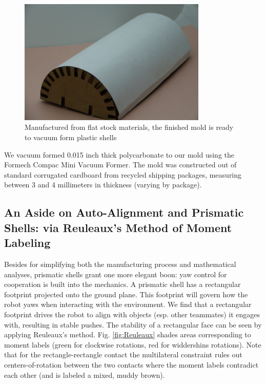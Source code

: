 \documentclass[letterpaper]{report}
\begin{document}
\begin{figure}
\centering
\includegraphics[width=0.8\textwidth]{FinishedMold.jpg}
\caption{\label{fig:Finished Mold}Manufactured from flat stock materials, the finished mold is ready to vacuum form plastic shells}
\end{figure}

We vacuum formed 0.015 inch thick polycarbonate to our mold using the Formech Compac Mini Vacuum Former.
The mold was constructed out of standard corrugated cardboard from recycled shipping packages, measuring between 3 and 4 millimeters in thickness (varying by package).

\subsection{An Aside on Auto-Alignment and Prismatic Shells: via Reuleaux's Method of Moment Labeling \label{sec:Reuleaux}}
Besides for simplifying both the manufacturing process and mathematical analyses, prismatic shells grant one more elegant boon: yaw control for cooperation is built into the mechanics.
A prismatic shell has a rectangular footprint projected onto the ground plane.
This footprint will govern how the robot yaws when interacting with the environment.
We find that a rectangular footprint drives the robot to align with objects (esp. other teammates) it engages with, resulting in stable pushes.
The stability of a rectangular face can be seen by applying Reuleaux's method.
Fig. \ref{fig:Reuleaux} shades areas corresponding to moment labels (green for clockwise rotations, red for widdershins rotations).
Note that for the rectangle-rectangle contact the multilateral constraint rules out centers-of-rotation between the two contacts where the moment labels contradict each other (and is labeled a mixed, muddy brown).
\end{document}

